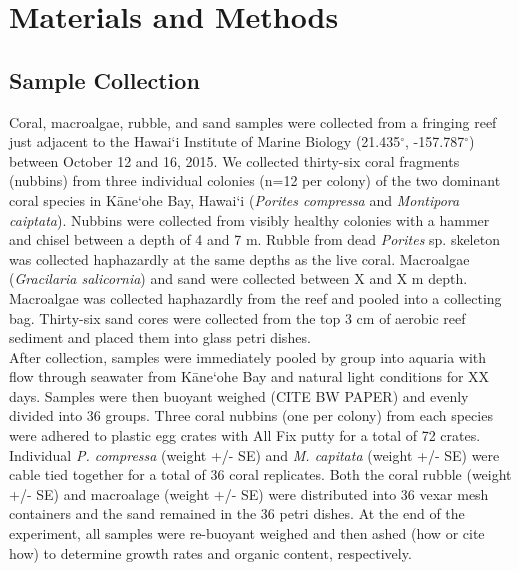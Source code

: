 \documentclass[]{rsos}%
\begin{document}
\maketitle

\section{Materials and Methods}
\subsection{Sample Collection}
 Coral, macroalgae, rubble, and sand samples were collected from a fringing reef just adjacent to the Hawai`i Institute of Marine Biology (21.435$^{\circ}$, -157.787$^{\circ}$) between October 12 and 16, 2015. We collected thirty-six coral fragments (nubbins) from three individual colonies (n=12 per colony) of the two dominant coral species in  K\={a}ne`ohe Bay, Hawai`i (\textit{Porites compressa} and \textit{Montipora caiptata}). Nubbins were collected from visibly healthy colonies with a hammer and chisel between a depth of 4 and 7 m. Rubble from dead \textit{Porites} sp. skeleton was collected haphazardly at the same depths as the live coral. Macroalgae (\textit{Gracilaria salicornia}) and sand were collected between X and X m depth. Macroalgae was collected haphazardly from the reef and pooled into a collecting bag. Thirty-six sand cores were collected from the top 3 cm of aerobic reef sediment and placed them into glass petri dishes. \\
\indent After collection, samples were immediately pooled by group into aquaria with flow through seawater from K\={a}ne`ohe Bay and natural light conditions for XX days. Samples were then buoyant weighed (CITE BW PAPER) and evenly divided into 36 groups. Three coral nubbins (one per colony) from each species were adhered to plastic egg crates with All Fix putty for a total of 72 crates. Individual \textit{P. compressa} (weight +/- SE) and \textit{M. capitata} (weight +/- SE) were cable tied together for a total of 36 coral replicates. Both the coral rubble (weight +/- SE) and macroalage (weight +/- SE) were distributed into 36 vexar mesh containers and the sand remained in the 36 petri dishes. At the end of the experiment, all samples were re-buoyant weighed and then ashed (how or cite how) to determine growth rates and organic content, respectively.
 
\end{document}
